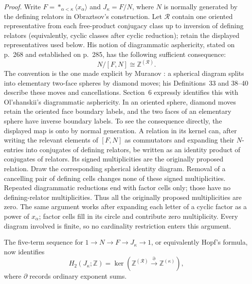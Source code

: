 \emph{Proof.}
Write $F=*_{\alpha<\kappa}\langle x_\alpha\rangle$ and
$J_\kappa=F/N$, where $N$ is normally generated by the defining
relators in Obraztsov's construction. Let $\mathcal R$ contain one
oriented representative from each free-product conjugacy class up to inversion
of defining relators (equivalently, cyclic classes after cyclic reduction);
retain the displayed representatives used below. His notion of
diagrammatic asphericity, stated on p.~268 and established on p.~285,
has the following sufficient consequence:
\begin{equation}\label{E:Jonsson:relationcoinvariants}
                  N/[F,N]\cong\mathbb Z^{(\mathcal R)}.
\end{equation}
The convention is the one made explicit by Muranov
\cite[Section~6, Definition~60; Sections~3.3--3.4]{EMuranov2007Width}: a spherical diagram splits into elementary two-face
spheres by diamond moves; his Definitions~33 and 38--40 describe
these moves and cancellations. Section~6 expressly identifies this
with Ol'shanskii's diagrammatic asphericity. In an oriented sphere,
diamond moves retain the oriented face boundary labels, and the
two faces of an elementary sphere have inverse boundary labels.
To see the consequence directly,
the displayed map is onto by normal generation. A relation in its
kernel can, after writing the relevant elements of $[F,N]$ as
commutators and expanding their $N$-entries into conjugates of
defining relators, be written as an identity product of conjugates
of relators. Its signed multiplicities are the originally proposed
relation. Draw the corresponding spherical identity diagram.
Removal of a cancelling pair of defining cells changes none of
these signed multiplicities. Repeated diagrammatic reductions end
with factor cells only; those have no defining-relator multiplicities.
Thus all the originally proposed multiplicities are zero. The
same argument works after expanding each letter of a cyclic factor
as a power of $x_\alpha$; factor cells fill in its circle and contribute
zero multiplicity. Every diagram involved is finite, so no
cardinality restriction enters this argument.

The five-term sequence for $1\to N\to F\to J_\kappa\to1$,
or equivalently Hopf's formula, now identifies
\begin{equation}\label{E:Jonsson:Hopfkernel}
 H_2(J_\kappa;\mathbb Z)
 =\ker\!\left(\mathbb Z^{(\mathcal R)}
                 \xrightarrow{\partial}\mathbb Z^{(\kappa)}\right),
\end{equation}
where $\partial$ records ordinary exponent sums.

